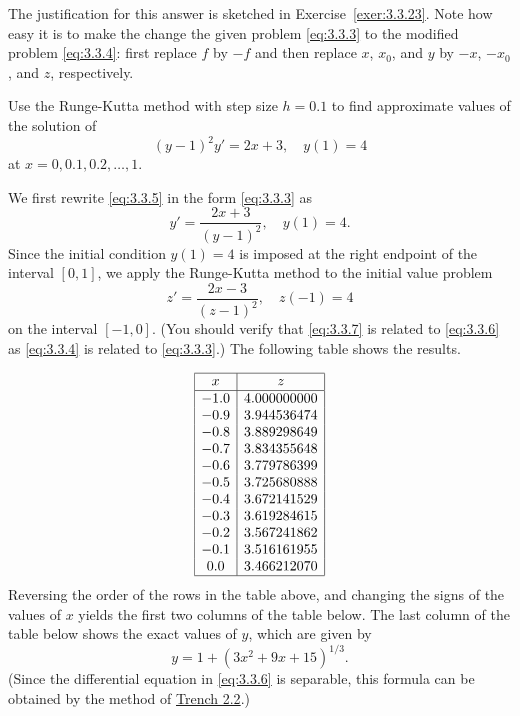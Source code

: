 \documentclass{ximera}
\begin{document}
The justification for this answer is sketched in
Exercise~\ref{exer:3.3.23}. Note how easy it is to make the change
the given problem \eqref{eq:3.3.3} to the modified problem
\eqref{eq:3.3.4}: first replace $f$ by $-f$ and then replace $x$,
$x_0$, and $y$ by $-x$, $-x_0$, and $z$, respectively.


\begin{example}\label{example:3.3.5}
Use the Runge-Kutta  method with step size $h=0.1$
 to find approximate values of the solution of
\begin{equation} \label{eq:3.3.5}
(y-1)^2y'=2x+3,\quad y(1)=4
\end{equation}
at $x=0, 0.1, 0.2, \dots, 1$.


\begin{explanation} 
We first rewrite \eqref{eq:3.3.5} in the form \eqref{eq:3.3.3}
as
\begin{equation} \label{eq:3.3.6}
y'=\frac{2x+3}{(y-1)^2},\quad y(1)=4.
\end{equation}
Since the initial condition $y(1)=4$  is imposed at the right endpoint
of the interval $[0,1]$, we apply the Runge-Kutta method to the
initial value problem
\begin{equation} \label{eq:3.3.7}
z'=\frac{2x-3}{(z-1)^2},\quad z(-1)=4
\end{equation}
on the interval $[-1,0]$.
(You should verify that \eqref{eq:3.3.7} is related to \eqref{eq:3.3.6} as
\eqref{eq:3.3.4} is related to \eqref{eq:3.3.3}.)
 The following table shows the results.  
 
$$
\begin{array}{|c|c|}
\hline
x&
z\\ \hline
-1.0 & 4.000000000  \\
-0.9 & 3.944536474  \\
-0.8 & 3.889298649  \\
-0.7 & 3.834355648  \\
-0.6 & 3.779786399  \\
-0.5 & 3.725680888  \\
-0.4 & 3.672141529  \\
-0.3 & 3.619284615  \\
-0.2 & 3.567241862  \\
-0.1 & 3.516161955  \\
 0.0 & 3.466212070 \\
\hline
\end{array}
$$
 Reversing the
order of the
rows in the table above, and changing the signs of the values of $x$
yields the first two columns of the table below.   The last
column of the table below shows the exact values of $y$, which
are given by
$$
y=1+(3x^2+9x+15)^{1/3}.
$$
(Since the differential equation in \eqref{eq:3.3.6} is separable,
this formula can be obtained by the method of \href{https://ximera.osu.edu/ode/main/separableEquations/separableEquations}{Trench 2.2}.)



\end{explanation}
\end{example}
\end{document}
